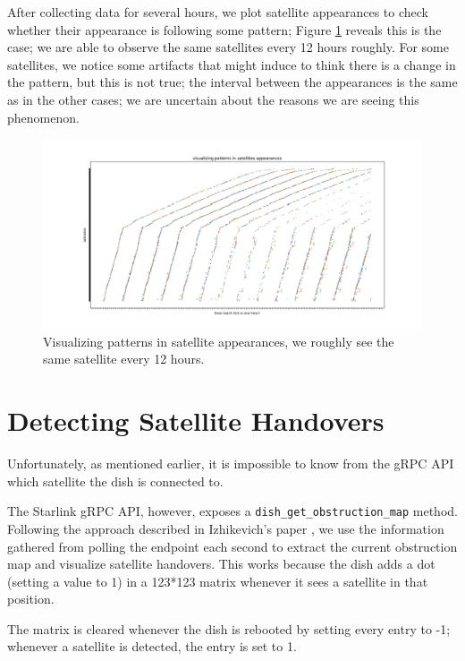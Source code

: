\documentclass[IN,11pt,twoside,openright,idp,english]{tumthesis}
\begin{document}
After collecting data for several hours, we plot satellite appearances to check whether their appearance is following
some pattern; Figure \ref{fig:vis-sat-pat} reveals this is the case; we are able to observe the same satellites every 12
hours roughly. For some satellites, we notice some artifacts that might induce to think there is a change in the
pattern, but this is not true; the interval between the appearances is the same as in the other cases; we are uncertain
about the reasons we are seeing this phenomenon.

\begin{figure}
    \centering
    \includegraphics[width=1.0\columnwidth]{img/visualizing-how-long-satellites-are-visible-for.png}
    \caption{Visualizing patterns in satellite appearances, we roughly see the same satellite every 12 hours.}
    \label{fig:vis-sat-pat}
\end{figure}

\section{Detecting Satellite Handovers}

Unfortunately, as mentioned earlier, it is impossible to know from the gRPC API which satellite the dish is connected to.

The Starlink gRPC API, however, exposes a \texttt{dish\_get\_obstruction\_map} method. Following the approach described
in Izhikevich's paper \cite{izhikevich2023democratizing}, we use the information gathered from polling the endpoint each
second to extract the current obstruction map and visualize satellite handovers. This works because the dish adds a dot
(setting a value to 1) in a 123*123 matrix whenever it sees a satellite in that position. 

The matrix is cleared whenever the dish is rebooted by setting every entry to -1; whenever a satellite is detected, the
entry is set to 1. 
\end{document}
